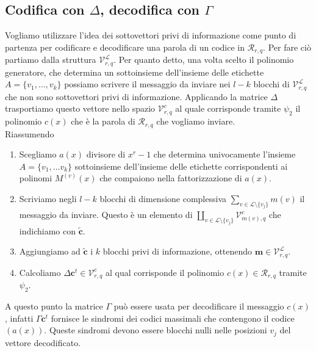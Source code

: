 \subsection{Codifica con $\Delta$, decodifica con $\Gamma$}
Vogliamo utilizzare l'idea dei sottovettori privi di informazione come punto di partenza per codificare e decodificare una parola di un codice in $\mathcal{R}_{r,q}$. Per fare ciò partiamo dalla struttura $\mathcal{V}_{r, q}^{\mathscr{L}}$. Per quanto detto, una volta scelto il polinomio generatore, che determina un sottoinsieme dell'insieme delle etichette $A = \lbrace v_{1}, \dots , v_{k} \rbrace $ possiamo scrivere il messaggio da inviare nei $l-k$ blocchi di $\mathcal{V}_{r, q}^{\mathscr{L}}$ che non sono sottovettori privi di informazione. Applicando la matrice $\Delta$ trasportiamo questo vettore nello spazio $\mathcal{V}_{r, q}^{c}$ al quale corrisponde tramite $\psi_{2}$ il polinomio $c(x)$ che è la parola di $\mathcal{R}_{r,q}$ che vogliamo inviare. \\
Riassumendo
\begin{enumerate}
   \item Scegliamo $a(x)$ divisore di $x^r - 1$ che determina univocamente l'insieme $A=\lbrace v_{1}, \dots v_{k} \rbrace$ sottoinsieme dell'insieme delle etichette corrispondenti ai polinomi $M^{(v)}(x)$ che compaiono nella fattorizzazione di $a(x)$.
   \item Scriviamo negli $l-k$ blocchi di dimensione complessiva $\sum_{v\in \mathscr{L} \setminus \lbrace v_{j}\rbrace} m(v)$ il messaggio da inviare. Questo è un elemento di $\coprod_{v\in \mathscr{L} \setminus \lbrace v_{j}\rbrace} \mathcal{V}_{m(v), q}^{c}$ che indichiamo con $\tilde{\mathbf{c}}$. 
   \item Aggiungiamo ad $\tilde{\mathbf{c}} $ i $k$ blocchi privi di informazione, ottenendo $\mathbf{m} \in \mathcal{V}_{r, q}^{\mathscr{L}} $.
   \item Calcoliamo $\Delta \mathbf{c}^{t} \in \mathcal{V}_{r, q}^{c}$ al qual corrisponde il polinomio  $c(x) \in \mathcal{R}_{r,q}$ tramite $\psi_{2}$.
\end{enumerate}
A questo punto la matrice $\Gamma$ può essere usata per decodificare il messaggio $c(x)$, infatti $\Gamma \mathbf{c}^{t} $ fornisce le sindromi dei codici massimali che contengono il codice $(a(x))$. Queste sindromi devono essere blocchi nulli nelle posizioni $v_{j}$ del vettore decodificato.












